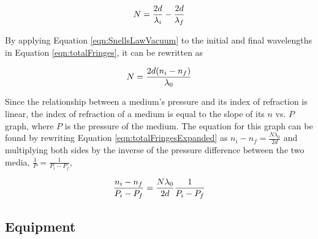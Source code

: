 \documentclass[12pt]{article}
\begin{document}
\begin{equation}
  \label{eqn:totalFringes}
  N = \frac{2d}{\lambda_i} - \frac{2d}{\lambda_f} \\
\end{equation}

By applying Equation \ref{eqn:SnellsLawVacuum} to the initial and final
wavelengths in Equation \ref{eqn:totalFringes}, it can be rewritten as

\begin{equation}
  \label{eqn:totalFringesExpanded}
  N = \frac{2 d (n_i - n_f)}{\lambda_0} \\
\end{equation}

\qq Since the relationship between a medium's pressure and its index of
refraction is linear, the index of refraction of a medium is equal to the slope
of its \(n\) vs. \(P\) graph, where \(P\) is the pressure of the medium. The
equation for this graph can be found by rewriting Equation
\ref{eqn:totalFringesExpanded} as \(n_i - n_f = \frac{N \lambda_0}{2 d}\) and
multiplying both sides by the inverse of the pressure difference between the two
media, \(\frac{1}{P} = \frac{1}{P_i - P_f}\),

\begin{equation}
  \label{eqn:nVsP}
  \frac{n_i - n_f}{P_i - P_f} = \frac{N \lambda_0}{2 d} \frac{1}{P_i - P_f} \\
\end{equation}

\subsection{Equipment}
\end{document}
